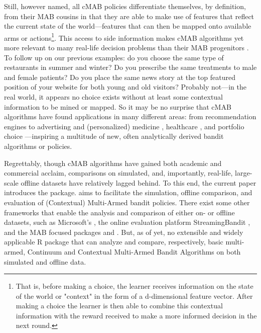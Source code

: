 \documentclass{jss}\usepackage[]{graphicx}\usepackage[]{color}
\begin{document}
Still, however named, all cMAB policies differentiate themselves, by definition, from their MAB cousins in that they are able to make use of features that reflect the current state of the world---features that can then be mapped onto available arms or actions\footnote{That is, before making a choice, the learner receives information on the state of the world or "context" in the form of a d-dimensional feature vector. After making a choice the learner is then able to combine this contextual information with the reward received to make a more informed decision in the next round.}. This access to side information makes cMAB algorithms yet more relevant to many real-life decision problems than their MAB progenitors \citep{Langford2008}. To follow up on our previous examples: do you choose the same  type of restaurants in summer and winter? Do you prescribe the same treatments to male and female patients? Do you place the same news story at the top featured position of your website for both young and old visitors? Probably not---in the real world, it appears no choice exists without at least some contextual information to be mined or mapped. So it may be no surprise that cMAB algorithms have found applications in many different areas: from recommendation engines \citep{Lai1985} to advertising \citep{Tang2013} and (personalized) medicine \citep{Tewari2017}, healthcare \cite{Rabbi2015}, and portfolio choice \citep{Shen2015}---inspiring a multitude of new, often analytically derived bandit algorithms or policies.

Regrettably, though cMAB algorithms have gained both academic and commercial acclaim, comparisons on simulated, and, importantly, real-life, large-scale offline datasets \citep{Li2011} have relatively lagged behind. To this end, the current paper introduces the   package.  aims to facilitate the simulation, offline comparison, and evaluation of (Contextual) Multi-Armed bandit policies. There exist some other frameworks that enable the analysis and comparison of either on- or offline datasets, such as Microsoft's  \citep{Langford2007}, the online evaluation platform StreamingBandit \citep{Kaptein2016}, and the MAB focused  packages  \citep{striatum} and  \citep{SMPyBandits}. But, as of yet, no extensible and widely applicable R \citep{RCore} package that can analyze and compare, respectively, basic multi-armed, Continuum \citep{Agrawal1995} and Contextual Multi-Armed Bandit Algorithms on both simulated and offline data.
\end{document}
